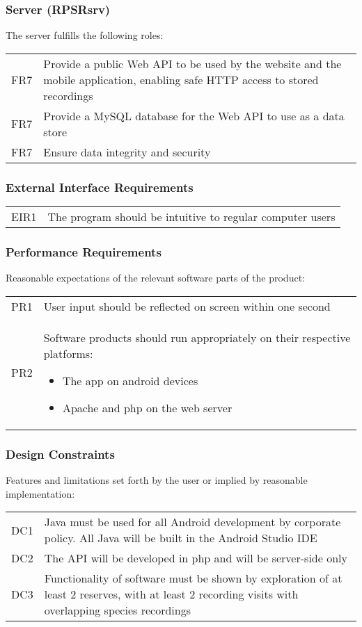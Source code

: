 \subsubsection{Server (RPSRsrv)}
    The server fulfills the following roles:\\
    \begin{tabular}{r | p{15cm}}
        FR7 & Provide a public Web API to be used by the website and the mobile application, enabling safe HTTP access to stored recordings \\
        FR7 & Provide a MySQL database for the Web API to use as a data store \\
        FR7 & Ensure data integrity and security \\
	\end{tabular}

\subsubsection{External Interface Requirements}
	\begin{tabular}{r | p{15cm}}
		EIR1 & The program should be intuitive to regular computer users \\
	\end{tabular}

\subsubsection{Performance Requirements}
	Reasonable expectations of the relevant software parts of the product: \\
	\begin{tabular}{r | p{15cm}}
		PR1 & User input should be reflected on screen within one second \\
		PR2 & Software products should run appropriately on their respective platforms:
		\begin{itemize}
			\item The app on android devices
			\item Apache and php on the web server
		\end{itemize}
	\end{tabular}

\subsubsection{Design Constraints}
	Features and limitations set forth by the user or implied by reasonable implementation: \\
	\begin{tabular}{r | p{15cm}}
		DC1 & Java must be used for all Android development by corporate policy. All Java will be built in the Android Studio IDE \\
		DC2 & The API will be developed in php and will be server-side only \\
		DC3 & Functionality of software must be shown by exploration of at least 2 reserves, with at least 2 recording visits with overlapping species recordings \\
	\end{tabular}

